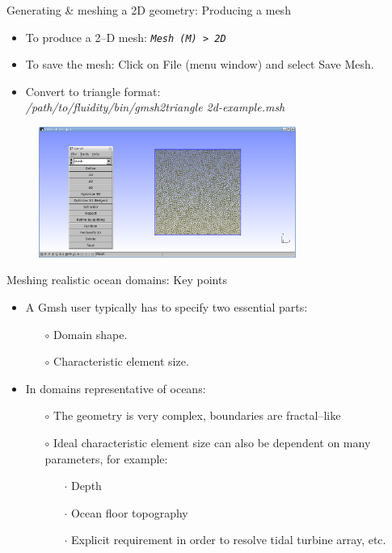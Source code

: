\documentclass[t]{beamer}
\begin{document}
\begin{frame}{Generating \& meshing a 2D geometry: Producing a mesh}
   \begin{itemize}
      \item To produce a 2--D mesh: \emph{ \lstinline{Mesh (M) > 2D}}
      \item To save the mesh: Click on File (menu window) and select Save Mesh.
      \item Convert to triangle format:\\ \emph{/path/to/fluidity/bin/gmsh2triangle 2d-example.msh}
   \end{itemize}
\begin{figure}[htbp]
 \centering
  \includegraphics[width=0.75\textwidth]{../figures/2d-example-Gmsh-mesh}
  \label{fig:shot16}
\end{figure}
\end{frame}

\begin{frame}{Meshing realistic ocean domains: Key points}
\begin{itemize}
   \item A Gmsh user typically has to specify two essential parts:
   \begin{itemize}
      \item[$\circ$] Domain shape.
      \item[$\circ$] Characteristic element size.
   \end{itemize}\vspace{20pt}
   \item In domains representative of oceans:
   \begin{itemize}
      \item[$\circ$] The geometry is very complex, boundaries are fractal--like
      \item[$\circ$] Ideal characteristic element size can also be dependent on many parameters, for example:
      \begin{itemize}
         \item[$\cdot$] Depth
         \item[$\cdot$] Ocean floor topography
         \item[$\cdot$] Explicit requirement in order to resolve tidal turbine array, etc.
      \end{itemize}
   \end{itemize}
\end{itemize}
\end{frame}
\end{document}
